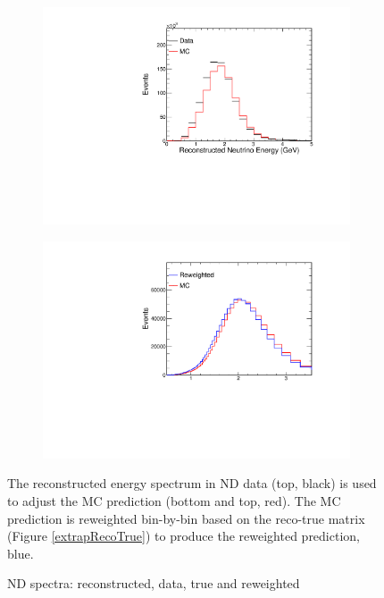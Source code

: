 \begin{figure}
\begin{center}
  \begin{subfigure}[b]{0.8\textwidth}
    \centering
    \includegraphics[width=\textwidth]{figures/plots/extrap/NDReco.pdf}
  \end{subfigure}

  \begin{subfigure}[b]{0.8\textwidth}
    \centering
    \includegraphics[width=\textwidth]{figures/plots/extrap/NDTrue.pdf}
  \end{subfigure}

\end{center}
\caption{ND spectra: reconstructed, data, true and reweighted}{
The reconstructed energy spectrum in ND data (top, black) is used to adjust the
MC prediction (bottom and top, red).
The MC prediction is reweighted bin-by-bin based on the reco-true matrix
(Figure \ref{extrapRecoTrue}) to produce the reweighted prediction, blue.
}
\label{extrapNDDataRecoTrue}
\end{figure}

